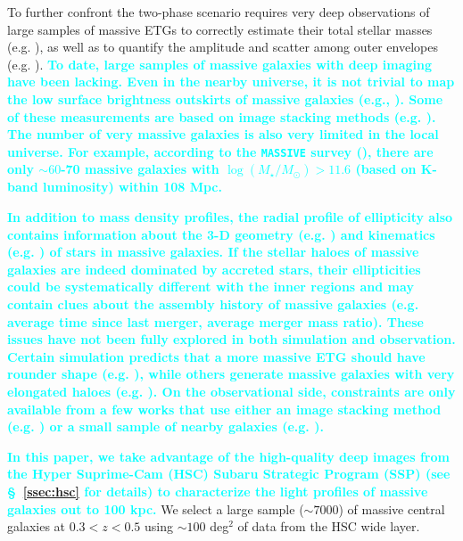 \documentclass[fleqn,usenatbib]{mnras}
\def\logms{{$\log (M_{\star}/M_{\odot})$}}
\newcommand{\song}[1]{\textcolor{cyan}{\textbf{#1}}}
\newcommand{\susan}[1]{\textcolor{Bittersweet}{\textbf{#1}}}
\begin{document}
    To further confront the two-phase scenario requires very deep observations of 
    large samples of massive ETGs to correctly estimate their total stellar masses
    (e.g. \citealt{Bernardi2013, DSouza2014}), as well as to quantify the amplitude and 
    scatter among outer envelopes (e.g. \citealt{Capaccioli2015, Iodice2016, 
    Iodice2017}).
    \song{
    To date, large samples of massive galaxies with deep imaging have been lacking. 
    Even in the nearby universe, it is not trivial to map the low surface
    brightness outskirts of massive galaxies (e.g., 
    \citealt{Capaccioli2015, Iodice2016, Iodice2017, Spavone2017, Mihos2017}). 
    Some of these measurements are based on image stacking methods (e.g. 
    \citealt{Tal2011, dSouza2015}). 
    The number of very massive galaxies is also very limited in the local universe.
    For example, according to the \texttt{MASSIVE} survey (\citealt{Ma2014}), there
    are only $\sim 60$-70 massive galaxies with \logms$> 11.6$ (based on K-band 
    luminosity) within 108 Mpc.
    }
    
    \song{
    In addition to mass density profiles, the radial profile of ellipticity also 
    contains information about the 3-D geometry (e.g. \citealt{Tremblay1995, 
    Tremblay1996, Chang2013, RodriguezPadilla2013, Mitsuda2017}) and kinematics 
    (e.g. \citealt{Cappellari2012, Weijmans2014}) of stars in massive galaxies.
    If the stellar haloes of massive galaxies are indeed dominated by accreted 
    stars, their ellipticities could be systematically different with the inner 
    regions and may contain clues about the assembly history of massive galaxies 
    (e.g. average time since last merger, average merger mass ratio).
    These issues have not been fully explored in both simulation and observation.
    Certain simulation predicts that a more massive ETG should have rounder shape
    (e.g. \citealt{Wu2014}), while others generate massive galaxies with very 
    elongated haloes (e.g. \citealt{Li2017}).  
    On the observational side, constraints are only available from a few works 
    that use either an image stacking method (e.g. \citealt{Tal2011, dSouza2015}) 
    or a small sample of nearby galaxies (e.g. \citealt{Spavone2017}).
    }
        
    \song{
    In this paper, we take advantage of the high-quality deep images from the 
    Hyper Suprime-Cam (HSC) Subaru Strategic Program (SSP) \citep[SSP,][]{HSC-DR1} 
    (see \S~\ref{ssec:hsc} for details) to characterize  the light profiles of 
    massive galaxies out to 100 kpc. 
    }
    We select a large sample (${\sim} 7000$) of massive central galaxies 
    at $0.3 < z < 0.5$ using ${\sim} 100$ deg$^2$ of data from the HSC wide layer. 
   
\end{document}
